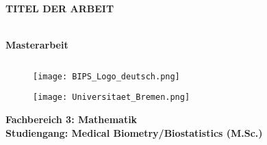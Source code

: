 \documentclass[12pt, a4paper]{report}\usepackage[]{graphicx}\usepackage[]{color}
\begin{document}
\thispagestyle{empty}

\begin{center}
\textbf{\LARGE{TITEL DER ARBEIT\\}} 
\end{center}

\begin{center}
\textbf{\Large{\\Masterarbeit}}
\end{center}
\begin{verbatim}

\end{verbatim}


\begin{figure}[htbp]
 \begin{minipage}{0.4\linewidth}
  \centering
  \texttt{[image: BIPS\_Logo\_deutsch.png]}
 \end{minipage}%
 \begin{minipage}{0.5\linewidth}
  \centering
  \texttt{[image: Universitaet\_Bremen.png]}
 \end{minipage}
\end{figure} 


\begin{comment}
\begin{subfigure}[htbp]
\begin{center}
\setkeys{Gin}{width=0.2\textwidth}
\texttt{[image: BIPS\_Logo\_deutsch.png]}
\end{center}
\end{subfigure}


\begin{subfigure}[htbp]
\begin{center}
\setkeys{Gin}{width=0.5\textwidth}
\texttt{[image: Universitaet\_Bremen.png]}
\end{center}
\end{subfigure}
\end{comment}
\begin{center}
\textbf{Fachbereich 3: Mathematik \\
Studiengang: Medical Biometry/Biostatistics (M.Sc.)\\}
\end{center}
\begin{verbatim}

\end{verbatim}
\end{document}
